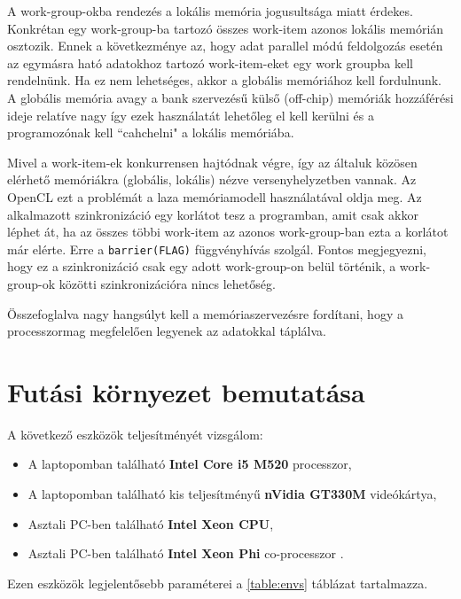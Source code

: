 	A work-group-okba rendezés a lokális memória jogusultsága miatt érdekes.
	Konkrétan egy work-group-ba tartozó összes work-item azonos lokális memórián
	osztozik.
	Ennek a következménye az, hogy adat parallel módú feldolgozás esetén
	az egymásra ható adatokhoz tartozó work-item-eket egy work groupba kell
	rendelnünk.
	Ha ez nem lehetséges, akkor a globális memóriához kell fordulnunk.
	A globális memória avagy a bank szervezésű külső (off-chip) memóriák
	hozzáférési ideje relatíve nagy így ezek használatát lehetőleg el kell kerülni
	és a programozónak kell ``cahchelni" a lokális memóriába.
	
	Mivel a work-item-ek konkurrensen hajtódnak végre, így az általuk közösen elérhető memóriákra
	(globális, lokális) nézve versenyhelyzetben vannak.
	Az OpenCL ezt a problémát a laza memóriamodell használatával oldja meg. Az alkalmazott
	szinkronizáció egy korlátot tesz a programban, amit csak akkor léphet át, ha az összes többi
	work-item az azonos work-group-ban ezta a korlátot már elérte. Erre a \texttt{barrier(FLAG)}
	függvényhívás szolgál. Fontos megjegyezni, hogy ez a szinkronizáció csak egy adott
	work-group-on belül történik, a work-group-ok közötti szinkronizációra nincs lehetőség. 
	
	\begin{center}
	Összefoglalva nagy hangsúlyt kell a memóriaszervezésre fordítani, hogy a
	processzormag megfelelően legyenek az adatokkal táplálva.
	\end{center}


\section{Futási környezet bemutatása}
	A következő eszközök teljesítményét vizsgálom:
	\begin{itemize}
		\item A laptopomban található \textbf{Intel Core i5 M520} processzor,
		\item A laptopomban található kis teljesítményű \textbf{nVidia GT330M} videókártya,
		\item Asztali PC-ben található \textbf{Intel Xeon CPU},
		\item Asztali PC-ben található \textbf{Intel Xeon Phi} co-processzor \cite{phi,mic }. 
	\end{itemize}
	Ezen eszközök legjelentősebb paraméterei a \ref{table:envs} táblázat tartalmazza.
	
